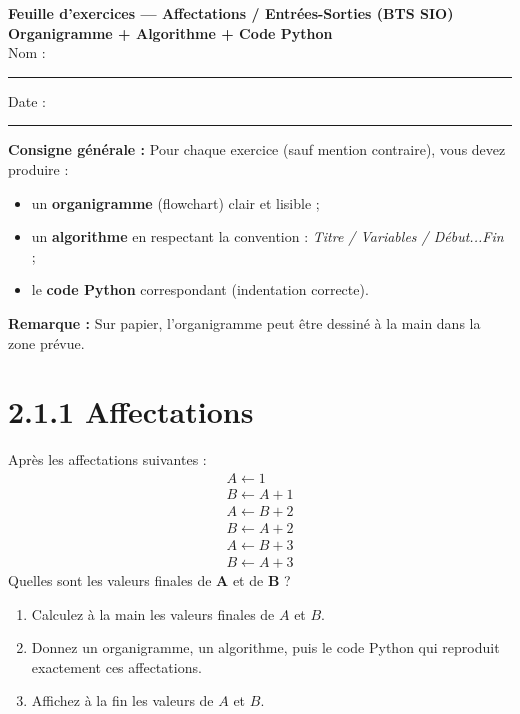 \documentclass[12pt,a4paper]{article}
\begin{document}
\begin{center}
{\LARGE \textbf{Feuille d’exercices — Affectations / Entrées-Sorties (BTS SIO)}}\\[4pt]
{\large \textbf{Organigramme + Algorithme + Code Python}}\\[6pt]
Nom : \rule{7cm}{0.4pt}\hfill Date : \rule{4cm}{0.4pt}
\end{center}

\begin{exobox}
\textbf{Consigne générale :} Pour chaque exercice (sauf mention contraire), vous devez produire :
\begin{itemize}
  \item un \textbf{organigramme} (flowchart) clair et lisible ;
  \item un \textbf{algorithme} en respectant la convention : \textit{Titre / Variables / Début...Fin} ;
  \item le \textbf{code Python} correspondant (indentation correcte).
\end{itemize}
\textbf{Remarque :} Sur papier, l’organigramme peut être dessiné à la main dans la zone prévue.
\end{exobox}

\section*{2.1.1 Affectations}

\begin{exobox}[title=\textbf{Exercice 1 — Jeu d’essai}]
Après les affectations suivantes :
\[
\begin{array}{l}
 A \leftarrow 1\\
 B \leftarrow A + 1\\
 A \leftarrow B + 2\\
 B \leftarrow A + 2\\
 A \leftarrow B + 3\\
 B \leftarrow A + 3
\end{array}
\]
Quelles sont les valeurs finales de \textbf{A} et de \textbf{B} ?
\end{exobox}

\begin{taskbox}
\begin{enumerate}
  \item Calculez à la main les valeurs finales de $A$ et $B$.
  \item Donnez un organigramme, un algorithme, puis le code Python qui reproduit exactement ces affectations.
  \item Affichez à la fin les valeurs de $A$ et $B$.
\end{enumerate}
\end{taskbox}
\end{document}
